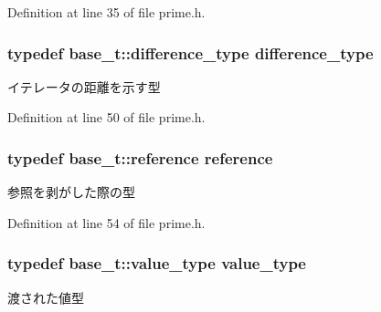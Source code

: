 \-Definition at line 35 of file prime.\-h.

\hypertarget{classyuh_1_1range__detail_1_1prime__iterator_a9ac6039762e1b262cecb98589ffc1d75}{
\subsubsection[{difference\-\_\-type}]{\setlength{\rightskip}{0pt plus 5cm}typedef base\-\_\-t\-::difference\-\_\-type {\bf difference\-\_\-type}}}\label{d9/dc8/classyuh_1_1range__detail_1_1prime__iterator_a9ac6039762e1b262cecb98589ffc1d75}
イテレータの距離を示す型 

\-Definition at line 50 of file prime.\-h.

\hypertarget{classyuh_1_1range__detail_1_1prime__iterator_aa5d67140d1557795cc6c30a2849d4e05}{
\subsubsection[{reference}]{\setlength{\rightskip}{0pt plus 5cm}typedef base\-\_\-t\-::reference {\bf reference}}}\label{d9/dc8/classyuh_1_1range__detail_1_1prime__iterator_aa5d67140d1557795cc6c30a2849d4e05}
参照を剥がした際の型 

\-Definition at line 54 of file prime.\-h.

\hypertarget{classyuh_1_1range__detail_1_1prime__iterator_ab7468d4ed49b58c84d6c1b71779fb43e}{
\subsubsection[{value\-\_\-type}]{\setlength{\rightskip}{0pt plus 5cm}typedef base\-\_\-t\-::value\-\_\-type {\bf value\-\_\-type}}}\label{d9/dc8/classyuh_1_1range__detail_1_1prime__iterator_ab7468d4ed49b58c84d6c1b71779fb43e}
渡された値型 

